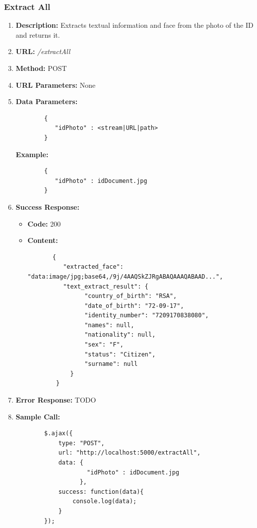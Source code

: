 \documentclass{article}
\begin{document}
        \subsubsection{Extract All}
        \begin{enumerate}
        	\item \textbf{Description:} Extracts textual information and face from the photo of the ID and returns it.
        	\item \textbf{URL:} \textit{/extractAll}
        	\item \textbf{Method:} POST
        	\item \textbf{URL Parameters:} None
        	\item \textbf{Data Parameters:}
        
        	\begin{lstlisting}
        {
           "idPhoto" : <stream|URL|path>
        }
        	\end{lstlisting}
        
        	\textbf{Example:}
        
        	\begin{lstlisting}
        {
           "idPhoto" : idDocument.jpg
        }
        	\end{lstlisting}
        	
        	\item \textbf{Success Response:} 
        		\begin{itemize}
        			\item \textbf{Code:} 200
        			\item \textbf{Content:}
        			\begin{lstlisting}
       {
          "extracted_face": "data:image/jpg;base64,/9j/4AAQSkZJRgABAQAAAQABAAD...", 
          "text_extract_result": {
                "country_of_birth": "RSA", 
                "date_of_birth": "72-09-17", 
                "identity_number": "7209170838080", 
                "names": null, 
                "nationality": null, 
                "sex": "F", 
                "status": "Citizen", 
                "surname": null
            }
        }
        			\end{lstlisting}
        		\end{itemize}
        		\item \textbf{Error Response:} TODO
        		\item \textbf{Sample Call:}
        		\begin{lstlisting}
        $.ajax({
            type: "POST",
            url: "http://localhost:5000/extractAll",
            data: {
                    "idPhoto" : idDocument.jpg
                  },
            success: function(data){
                console.log(data);
            }
        });
        		\end{lstlisting}
        \end{enumerate}
    
\end{document}
